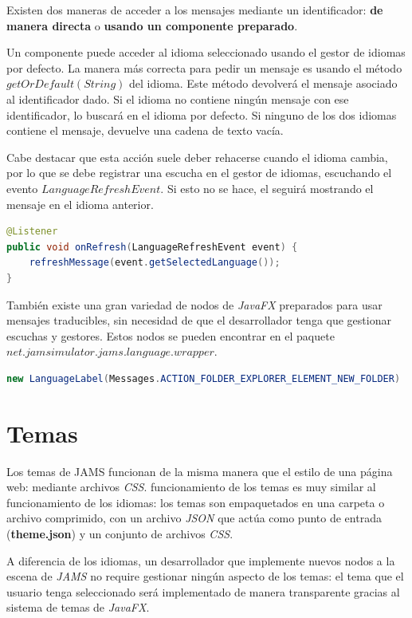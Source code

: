Existen dos maneras de acceder a los mensajes mediante un identificador:
\textbf{de manera directa} o \textbf{usando un componente preparado}.

\noindent Un componente puede acceder al idioma seleccionado usando
el gestor de idiomas por defecto.
La manera más correcta para pedir un mensaje es usando el método
$getOrDefault(String)$ del idioma.
Este método devolverá el mensaje asociado al identificador dado.
Si el idioma no contiene ningún mensaje con ese identificador,
lo buscará en el idioma por defecto.
Si ninguno de los dos idiomas contiene el mensaje,
devuelve una cadena de texto vacía.

\noindent Cabe destacar que esta acción suele deber rehacerse cuando
el idioma cambia, por lo que se debe registrar una escucha en el
gestor de idiomas, escuchando el evento $LanguageRefreshEvent$.
Si esto no se hace, el seguirá mostrando el mensaje en el idioma
anterior.

\begin{lstlisting}[language=Java,style=java,frame=single,label={lst:idioma-escucha}]
@Listener
public void onRefresh(LanguageRefreshEvent event) {
    refreshMessage(event.getSelectedLanguage());
}
\end{lstlisting}

\noindent También existe una gran variedad de nodos de \textit{JavaFX} preparados
para usar mensajes traducibles, sin necesidad de que el desarrollador tenga que
gestionar escuchas y gestores.
Estos nodos se pueden encontrar en el paquete
$net.jamsimulator.jams.language.wrapper$.

\begin{lstlisting}[language=Java,style=java,frame=single,label={lst:idioma-nodo}]
new LanguageLabel(Messages.ACTION_FOLDER_EXPLORER_ELEMENT_NEW_FOLDER)
\end{lstlisting}


\section{Temas}\label{sec:temas}

Los temas de JAMS funcionan de la misma manera que el estilo de una página web:
mediante archivos \textit{CSS}.
funcionamiento de los temas es muy similar al funcionamiento de los idiomas:
los temas son empaquetados en una carpeta o archivo comprimido,
con un archivo \textit{JSON} que actúa como punto de entrada (\textbf{theme.json})
y un conjunto de archivos \textit{CSS}.

\noindent A diferencia de los idiomas, un desarrollador que implemente nuevos
nodos a la escena de \textit{JAMS} no require gestionar ningún aspecto
de los temas: el tema que el usuario tenga seleccionado será implementado
de manera transparente gracias al sistema de temas de \textit{JavaFX}.

